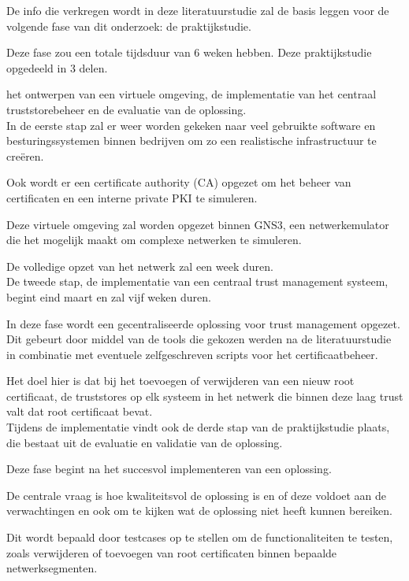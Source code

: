 De info die verkregen wordt in deze literatuurstudie zal de basis leggen voor de volgende fase van dit onderzoek: de praktijkstudie.

Deze fase zou een totale tijdsduur van 6 weken hebben. Deze praktijkstudie opgedeeld in 3 delen.

het ontwerpen van een virtuele omgeving, de implementatie van het centraal truststorebeheer en de evaluatie van de oplossing. \\


In de eerste stap zal er weer worden gekeken naar veel gebruikte software en besturingssystemen binnen bedrijven om zo een realistische infrastructuur te creëren.

Ook wordt er een certificate authority (CA) opgezet om het beheer van certificaten en een interne private PKI te simuleren.

Deze virtuele omgeving zal worden opgezet binnen GNS3, een netwerkemulator die het mogelijk maakt om complexe netwerken te simuleren. 

De volledige opzet van het netwerk zal een week duren. \\


De tweede stap, de implementatie van een centraal trust management systeem, begint eind maart en zal vijf weken duren.

In deze fase wordt een gecentraliseerde oplossing voor trust management opgezet. Dit gebeurt door middel van de tools die gekozen werden na de literatuurstudie in combinatie met eventuele zelfgeschreven scripts voor het certificaatbeheer.

Het doel hier is dat bij het toevoegen of verwijderen van een nieuw root certificaat, de truststores op elk systeem in het netwerk die binnen deze laag trust valt dat root certificaat bevat. \\


Tijdens de implementatie vindt ook de derde stap van de praktijkstudie plaats, die bestaat uit de evaluatie en validatie van de oplossing.

Deze fase begint na het succesvol implementeren van een oplossing.

De centrale vraag is hoe kwaliteitsvol de oplossing is en of deze voldoet aan de verwachtingen en ook om te kijken wat de oplossing niet heeft kunnen bereiken.

Dit wordt bepaald door testcases op te stellen om de functionaliteiten te testen, zoals verwijderen of toevoegen van root certificaten binnen bepaalde netwerksegmenten.

